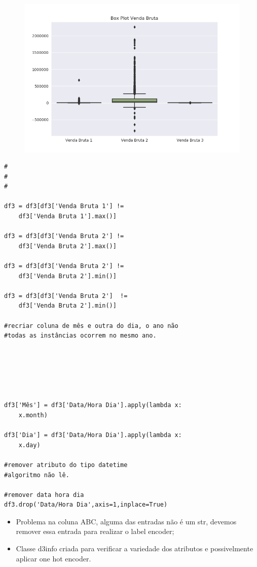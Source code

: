 \documentclass[compress]{beamer}
\begin{document}
\begin{frame}{}
    \begin{figure}
        \centering
        \includegraphics[scale=.5]{img/Box plot venda.png}
    \end{figure}
\end{frame}

\begin{verbatim}
#
#
#

df3 = df3[df3['Venda Bruta 1'] !=
    df3['Venda Bruta 1'].max()]
    
df3 = df3[df3['Venda Bruta 2'] !=
    df3['Venda Bruta 2'].max()]
    
df3 = df3[df3['Venda Bruta 2'] !=
    df3['Venda Bruta 2'].min()]
    
df3 = df3[df3['Venda Bruta 2']  !=
    df3['Venda Bruta 2'].min()]
    
#recriar coluna de mês e outra do dia, o ano não
#todas as instâncias ocorrem no mesmo ano.






df3['Mês'] = df3['Data/Hora Dia'].apply(lambda x:
    x.month)

df3['Dia'] = df3['Data/Hora Dia'].apply(lambda x:
    x.day)

#remover atributo do tipo datetime
#algoritmo não lê.

#remover data hora dia
df3.drop('Data/Hora Dia',axis=1,inplace=True)    

\end{verbatim}


\begin{frame}{}
    \begin{itemize}
        \item Problema na coluna ABC, alguma das entradas não é um str, devemos remover essa entrada para realizar o label encoder;
        \item Classe d3info criada para verificar a variedade dos atributos e possivelmente aplicar one hot encoder.
    \end{itemize}
\end{frame}
\end{document}
